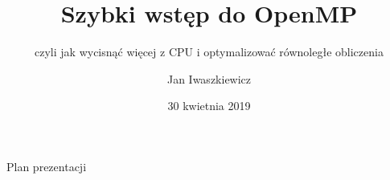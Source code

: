 \documentclass{if-beamer}
\title[Szybki wstęp do OpenMP]{Szybki wstęp do OpenMP}
\subtitle{czyli jak wycisnąć więcej z CPU i optymalizować równoległe obliczenia}
\author{Jan Iwaszkiewicz}
\institute[MFI]{
  Wydział Matematyki, Fizyki i Informatyki\\
  Uniwersytet Gdański
}
\date{30 kwietnia 2019}
\begin{document}
\begin{frame}
  \titlepage
\end{frame}

\usebackgroundtemplate{} 
\begin{frame}{Plan prezentacji}
  \tableofcontents
\end{frame}

\end{document}
